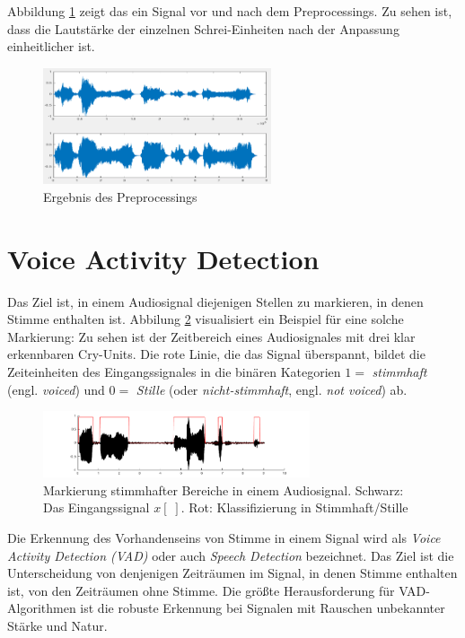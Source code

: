 Abbildung \ref{img:compressing01} zeigt das ein Signal vor und nach dem Preprocessings. Zu sehen ist, dass die Lautstärke der einzelnen Schrei-Einheiten nach der Anpassung einheitlicher ist. 

\begin{figure}[h]
	\centering
	\includegraphics[width=0.6\textwidth]{bilder/compressing01.png}
	\caption{Ergebnis des Preprocessings}
	\label{img:compressing01}
\end{figure}

\section{Voice Activity Detection}
\label{sec:vad}

Das Ziel ist, in einem Audiosignal diejenigen Stellen zu markieren, in denen Stimme enthalten ist. Abbilung \ref{img:vad01} visualisiert ein Beispiel für eine solche Markierung: Zu sehen ist der Zeitbereich eines Audiosignales mit drei klar erkennbaren Cry-Units. Die rote Linie, die das Signal überspannt, bildet die Zeiteinheiten des Eingangssignales in die binären Kategorien $1 =$ \emph{stimmhaft} (engl. \emph{voiced}) und $0 = $ \emph{Stille} (oder \emph{nicht-stimmhaft}, engl. \emph{not voiced}) ab.

\begin{figure}[h]
	\centering
	\includegraphics[width=0.7\textwidth]{bilder/vad_introduction01.png}
	\caption{Markierung stimmhafter Bereiche in einem Audiosignal. Schwarz: Das Eingangssignal $x[\;]$. Rot: Klassifizierung in Stimmhaft/Stille}
	\label{img:vad01}
\end{figure}

Die Erkennung des Vorhandenseins von Stimme in einem Signal wird als \emph{Voice Activity Detection (VAD)} oder auch \emph{Speech Detection} bezeichnet. Das Ziel ist die Unterscheidung von denjenigen Zeiträumen im Signal, in denen Stimme enthalten ist, von den Zeiträumen ohne Stimme. Die größte Herausforderung für VAD-Algorithmen ist die robuste Erkennung bei Signalen mit Rauschen unbekannter Stärke und Natur. \cite[S. 1]{vad_kola} \cite[S. 1]{vad_Lisboa}

